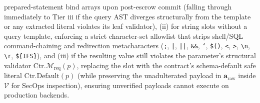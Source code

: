 \documentclass[conference,10pt]{IEEEtran}
\begin{document}
prepared-statement bind arrays upon post-escrow commit (falling through immediately to Tier iii if the query AST diverges structurally from the template or any extracted literal violates its leaf validator), (ii) for string slots without a query template, enforcing a strict character-set allowlist that strips shell/SQL command-chaining and redirection metacharacters (\texttt{;}, \texttt{|}, \texttt{||}, \texttt{\&\&}, \texttt{`}, \texttt{\$()}, \texttt{<}, \texttt{>}, \texttt{\textbackslash n}, \texttt{\textbackslash r}, \texttt{\$\{IFS\}}), and (iii) if the resulting value still violates the parameter's structural validator $\text{Ctr}.\mathcal{M}_{\text{req}}(p)$, replacing the slot with the contract's schema-default safe literal $\text{Ctr.Default}(p)$ (while preserving the unadulterated payload in $\mathbf{a}_{\text{raw}}$ inside $\mathcal{V}$ for SecOps inspection), ensuring unverified payloads cannot execute on production backends.
\end{document}
